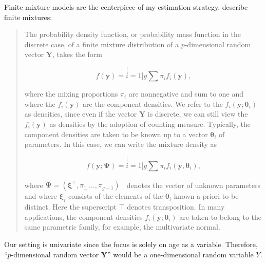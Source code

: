 \documentclass[english]{article}
\begin{document}
Finite mixture models are the centerpiece of my estimation strategy.
\cite{McLachlan2019} describe finite mixtures:
\begin{quote}
The probability density function, or probability mass function in
the discrete case, of a finite mixture distribution of a $p$-dimensional
random vector $\boldsymbol{Y}$, takes the form

\begin{equation}
f(\boldsymbol{y})=\stackrel[i=1]{g}{\sum}\pi_{i}f_{i}(\boldsymbol{y}),\label{eq:McLachlan-nonparametric-mixture-model}
\end{equation}

where the mixing proportions $\pi_{i}$ are nonnegative and sum to
one and where the $f_{i}(\boldsymbol{y})$ are the component densities.
We refer to the $f_{i}(\boldsymbol{y};\boldsymbol{\theta}_{i})$ as
densities, since even if the vector $\boldsymbol{Y}$ is discrete,
we can still view the $f_{i}(\boldsymbol{y})$ as densities by the
adoption of counting measure. Typically, the component densities are
taken to be known up to a vector $\boldsymbol{\theta}_{i}$ of parameters.
In this case, we can write the mixture density as

\begin{equation}
f(\boldsymbol{y};\boldsymbol{\Psi})=\stackrel[i=1]{g}{\sum}\pi_{i}f_{i}(\boldsymbol{y},\boldsymbol{\theta}_{i}),\label{eq:McLachlan-parametric-mixture-model}
\end{equation}

where $\boldsymbol{\Psi}=(\boldsymbol{\xi}^{\top},\pi_{1,}\dots,\pi_{g-1})^{\top}$
denotes the vector of unknown parameters and where $\boldsymbol{\xi}_{i}$
consists of the elements of the $\boldsymbol{\theta}_{i}$ known a
priori to be distinct. Here the superscript $\top$ denotes transposition.
In many applications, the component densities $f_{i}(\boldsymbol{y};\boldsymbol{\theta}_{i})$
are taken to belong to the same parametric family, for example, the
multivariate normal.
\end{quote}
Our setting is univariate since the focus is solely on age as a variable.
Therefore, ``$p$-dimensional random vector $\boldsymbol{Y}$''
would be a one-dimensional random variable $Y$.
\end{document}
